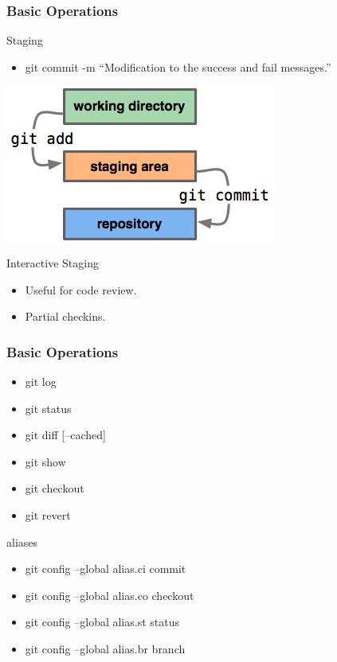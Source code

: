 \documentclass[10pt]{beamer}
\begin{document}
\begin{frame}
    \frametitle{Basic Operations}
    \begin{block}{Staging}
        \begin{itemize}
            \item git commit -m ``Modification to the success and fail messages.''
        \end{itemize}
    \end{block}
    \begin{center}\includegraphics{images/index1.png}\end{center}
        \begin{block}{Interactive Staging}
            \begin{itemize}
                \item Useful for code review.
                \item Partial checkins. 
            \end{itemize}
        \end{block}
\end{frame}

\begin{frame}
    \frametitle{Basic Operations}
    \begin{itemize}
        \item git log
        \item git status
        \item git diff [--cached]
        \item git show
        \item git checkout
        \item git revert
    \end{itemize}
    \begin{block}{aliases}
        \begin{itemize}
            \item git config --global alias.ci commit
            \item git config --global alias.co checkout
            \item git config --global alias.st status
            \item git config --global alias.br branch
        \end{itemize}
    \end{block}
\end{frame}
\end{document}
